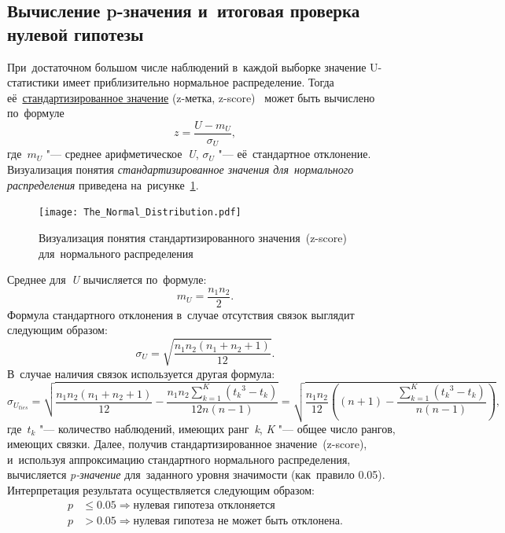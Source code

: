 \documentclass[]{scrreprt}
\begin{document}
\subsection{Вычисление p-значения и~итоговая проверка нулевой гипотезы}
При~достаточном большом числе наблюдений в~каждой выборке значение U-статистики имеет приблизительно нормальное распределение. Тогда её~\href{https://en.wikipedia.org/wiki/Standard_score}{стандартизированное значение} (z-метка, \foreignlanguage{english}{z-score})~\cite{Wiki:z-score} может быть вычислено по~формуле
\begin{equation}\label{eq:z-score}
z = \frac{U-m_{U}}{\sigma_{U}},
\end{equation}
где~${\textstyle m_{U}}$ "--- среднее арифметическое~\textit{U}, ${\textstyle \sigma_{U}}$ "--- её~стандартное отклонение. Визуализация понятия \emph{стандартизированное значения для~нормального распределения} приведена на~рисунке~\ref{fig:z-score}.
\begin{figure}[ht]
	\centering
	\texttt{[image: The\_Normal\_Distribution.pdf]}
	\caption{Визуализация понятия стандартизированного значения~(z-score) для~нормального распределения \cite{Wiki:z-score}}\label{fig:z-score}
\end{figure}
Среднее для~\textit{U} вычисляется по~формуле:
\begin{equation}\label{eq:U-mean}
m_{U} = \frac{n_{1}n_{2}}{2}.
\end{equation}
Формула стандартного отклонения в~случае отсутствия связок выглядит следующим образом:
\begin{equation}\label{eq:standard-deviation-no-ties}
\sigma_{U} =  \sqrt{\frac{n_{1}n_{2}(n_{1}+n_{2}+1)}{12}}.
\end{equation}
В~случае наличия связок используется другая формула:
\begin{equation}\label{eq:standard-deviation-ties}
\sigma_{U_{ties}} = \sqrt{\frac{n_{1}n_{2}(n_{1}+n_{2}+1)}{12} - \frac{n_{1}n_{2}\sum_{k=1}^{K}({t_{k}}^{3} - t_{k})}{12n(n-1)}} = \sqrt{\frac{n_{1}n_{2}}{12} \left((n+1)-\frac{\sum_{k=1}^{K}({t_{k}}^{3} - t_{k})}{n(n-1)}\right)},
\end{equation}
где~${\textstyle t_{k}}$ "--- количество наблюдений, имеющих ранг~\textit{k}, \textit{K} "--- общее число рангов, имеющих связки.
Далее, получив стандартизированное значение~(z-score), и~используя аппроксимацию стандартного нормального распределения, вычисляется \textit{p-значение} для~заданного уровня значимости (как~правило 0.05). Интерпретация результата осуществляется следующим образом:
\begin{equation}\label{eq:p-interpretation}
	\begin{aligned}
	p &\leq 0.05 \Rightarrow \text{нулевая гипотеза отклоняется}\\
	p &> 0.05 \Rightarrow \text{нулевая гипотеза не может быть отклонена}.
	\end{aligned}
\end{equation}
\end{document}
